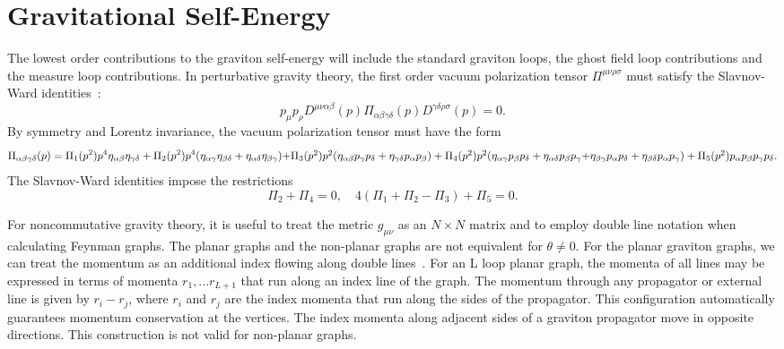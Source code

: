 \documentclass[a4paper,10pt]{article}
\begin{document}
\section{Gravitational Self-Energy}

The lowest order contributions to the graviton self-energy will include
the standard graviton loops, the ghost field loop contributions and the measure loop
contributions. In perturbative gravity theory, the first order vacuum
polarization tensor $\Pi^{\mu\nu\rho\sigma}$ must satisfy the Slavnov-Ward
identities~\cite{Medrano}:
\begin{equation}
\label{SlavnovWard}
p_\mu p_\rho
D^{\mu\nu\alpha\beta}(p)\Pi_{\alpha\beta\gamma\delta}(p)
D^{\gamma\delta\rho\sigma}(p)=0.
\end{equation}
By symmetry and Lorentz invariance, the vacuum polarization tensor must have the form
\begin{equation}
\Pi_{\alpha\beta\gamma\delta}(p)
=\Pi_1(p^2)p^4\eta_{\alpha\beta}\eta_{\gamma\delta}+\Pi_2
(p^2)p^4(\eta_{\alpha\gamma}\eta_{\beta\delta}
+\eta_{\alpha\delta}\eta_{\beta\gamma}) $$ $$
+\Pi_3(p^2)p^2(\eta_{\alpha\beta}p_\gamma p_\delta+\eta_{\gamma\delta}p_\alpha
p_\beta) +\Pi_4(p^2)p^2(\eta_{\alpha\gamma}p_\beta
p_\delta+\eta_{\alpha\delta}p_\beta p_\gamma $$ $$ +\eta_{\beta\gamma}p_\alpha
p_\delta+\eta_{\beta\delta}p_\alpha p_\gamma)+\Pi_5(p^2)p_\alpha p_\beta p_\gamma
p_\delta.
\end{equation}
The Slavnov-Ward identities impose the restrictions
\begin{equation}
\Pi_2+\Pi_4=0,\quad 4(\Pi_1+\Pi_2-\Pi_3)+\Pi_5=0.
\end{equation}

For noncommutative gravity theory, it is useful to treat the
metric $g_{\mu\nu}$ as an $N\times N$ matrix and to employ double line
notation when calculating Feynman graphs. The planar graphs and the
non-planar graphs are not equivalent for $\theta\not=0$. For the planar
graviton graphs, we can treat the momentum as an additional index flowing
along double lines~\cite{Hooft}. For an L loop planar graph, the momenta of
all lines may be expressed in terms of momenta $r_1,...r_{L+1}$ that run
along an index line of the graph. The momentum through any propagator or
external line is given by $r_i-r_j$, where $r_i$ and $r_j$ are the index
momenta that run along the sides of the propagator. This configuration
automatically guarantees momentum conservation at the vertices. The index
momenta along adjacent sides of a graviton propagator move in opposite
directions. This construction is not valid for non-planar graphs.
\end{document}
